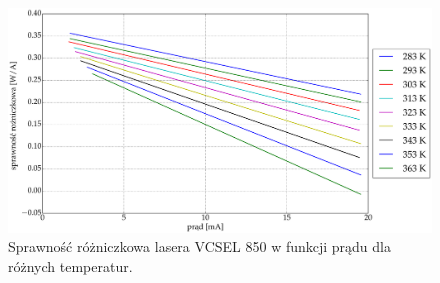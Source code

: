 \begin{figure}
\center
  \includegraphics[scale=0.30]{plot_vcsel_850/plot_eff_all_via_current.eps}
  \caption{Sprawność różniczkowa lasera VCSEL 850 w funkcji prądu dla różnych temperatur.}
  \label{fig:plot_eff_all_via_current_vcsel850}
\end{figure}
\newpage
